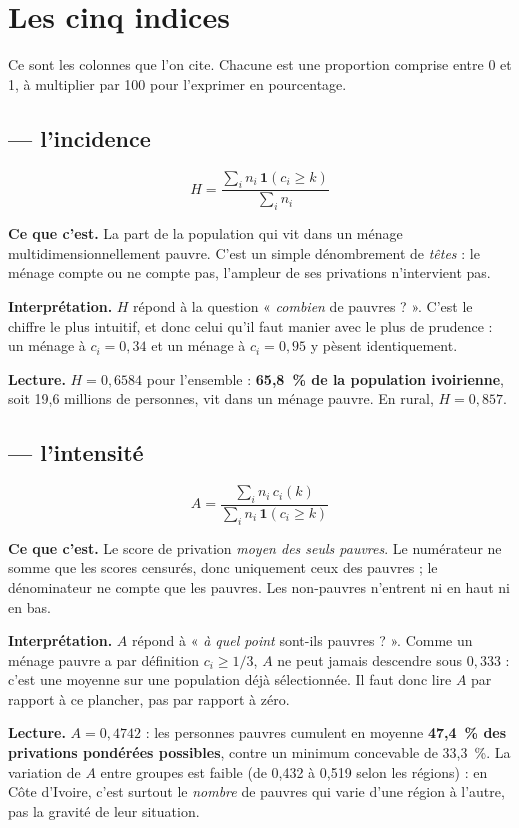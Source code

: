 \documentclass[11pt,a4paper]{article}
\begin{document}
\section{Les cinq indices}

Ce sont les colonnes que l'on cite. Chacune est une proportion comprise entre 0 et 1, à multiplier
par 100 pour l'exprimer en pourcentage.

\subsection*{ --- l'incidence}

\[
H = \frac{\sum_i n_i \, \mathbf{1}(c_i \ge k)}{\sum_i n_i}
\]

\textbf{Ce que c'est.} La part de la population qui vit dans un ménage
multidimensionnellement pauvre. C'est un simple dénombrement de \emph{têtes} : le ménage compte ou
ne compte pas, l'ampleur de ses privations n'intervient pas.

\textbf{Interprétation.} $H$ répond à la question « \emph{combien} de pauvres ? ». C'est le chiffre
le plus intuitif, et donc celui qu'il faut manier avec le plus de prudence : un ménage à $c_i =
0{,}34$ et un ménage à $c_i = 0{,}95$ y pèsent identiquement.

\textbf{Lecture.} $H = 0{,}6584$ pour l'ensemble : \textbf{65,8~\% de la population ivoirienne},
soit 19,6 millions de personnes, vit dans un ménage pauvre. En rural, $H = 0{,}857$.

\subsection*{ --- l'intensité}

\[
A = \frac{\sum_i n_i \, c_i(k)}{\sum_i n_i \, \mathbf{1}(c_i \ge k)}
\]

\textbf{Ce que c'est.} Le score de privation \emph{moyen des seuls pauvres}. Le numérateur ne
somme que les scores censurés, donc uniquement ceux des pauvres ; le dénominateur ne compte que
les pauvres. Les non-pauvres n'entrent ni en haut ni en bas.

\textbf{Interprétation.} $A$ répond à « \emph{à quel point} sont-ils pauvres ? ». Comme un ménage
pauvre a par définition $c_i \ge 1/3$, $A$ ne peut jamais descendre sous $0{,}333$ : c'est une
moyenne sur une population déjà sélectionnée. Il faut donc lire $A$ par rapport à ce plancher, pas
par rapport à zéro.

\textbf{Lecture.} $A = 0{,}4742$ : les personnes pauvres cumulent en moyenne \textbf{47,4~\% des
privations pondérées possibles}, contre un minimum concevable de 33,3~\%. La variation de $A$
entre groupes est faible (de 0,432 à 0,519 selon les régions) : en Côte d'Ivoire, c'est surtout le
\emph{nombre} de pauvres qui varie d'une région à l'autre, pas la gravité de leur situation.
\end{document}
